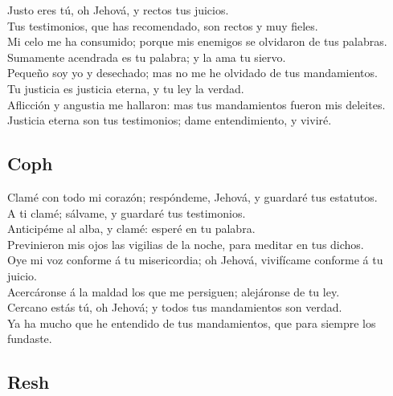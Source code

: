  Justo eres tú, oh Jehová, y rectos tus juicios.\\
 Tus testimonios, que has recomendado, son rectos y muy
fieles.\\
 Mi celo me ha consumido; porque mis enemigos se olvidaron
de tus palabras.\\
 Sumamente acendrada es tu palabra; y la ama tu siervo.\\
 Pequeño soy yo y desechado; mas no me he olvidado de tus
mandamientos.\\
 Tu justicia es justicia eterna, y tu ley la verdad.\\
 Aflicción y angustia me hallaron: mas tus mandamientos
fueron mis deleites.\\
 Justicia eterna son tus testimonios; dame entendimiento,
y viviré.

\hypertarget{coph}{%
\subsection{Coph}\label{coph}}

 Clamé con todo mi corazón; respóndeme, Jehová, y guardaré
tus estatutos.\\
 A ti clamé; sálvame, y guardaré tus testimonios.\\
 Anticipéme al alba, y clamé: esperé en tu palabra.\\
 Previnieron mis ojos las vigilias de la noche, para
meditar en tus dichos.\\
 Oye mi voz conforme á tu misericordia; oh Jehová,
vivifícame conforme á tu juicio.\\
 Acercáronse á la maldad los que me persiguen; alejáronse
de tu ley.\\
 Cercano estás tú, oh Jehová; y todos tus mandamientos son
verdad.\\
 Ya ha mucho que he entendido de tus mandamientos, que
para siempre los fundaste.

\hypertarget{resh}{%
\subsection{Resh}\label{resh}}

